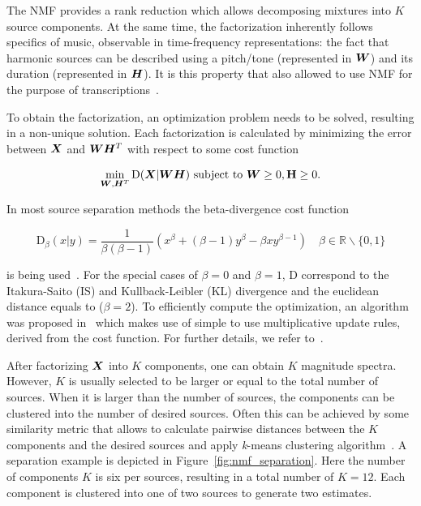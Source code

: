 The NMF provides a rank reduction which allows decomposing mixtures into \(K\) source components.
At the same time, the factorization inherently follows specifics of music, observable in time-frequency representations: the fact that harmonic sources can be described using a pitch/tone (represented in \({\bm{W}}\)) and its duration (represented in \({\bm{H}}\)).
It is this property that also allowed to use NMF for the purpose of transcriptions~\cite{smaragdis03}.
\par
To obtain the factorization, an optimization problem needs to be solved, resulting in a non-unique solution.
Each factorization is calculated by minimizing the error between \({\bm{X}}\) and \({\bm{W}} {\bm{H}}^{T}\) with respect to some cost function

\begin{equation}
  \min_{{\bm{W}},{\bm{H}}^{T}} \mathrm{D}({\bm{X}} | {\bm{W}} {\bm{H}}) \text { subject to } {\bm{W}} \geq 0 , \mathbf {{\bm{H}}} \geq 0.
\end{equation}

In most source separation methods the beta-divergence cost function

\begin{equation}
  \mathrm{D}_{\beta} (x | y) = \frac { 1 } { \beta ( \beta - 1 ) } \left( x ^ { \beta } + ( \beta - 1 ) y ^ { \beta } - \beta x y ^ { \beta - 1 } \right) \quad \beta \in \mathbb { R } \backslash \{ 0, 1 \}
\end{equation}

is being used~\cite{fitzgerald08a}. 
For the special cases of \(\beta = 0\) and \(\beta = 1\), \(\mathrm{D}\) correspond to the Itakura-Saito (IS) and Kullback-Leibler (KL) divergence and the euclidean distance equals to (\(\beta = 2\)).
To efficiently compute the optimization, an algorithm was proposed in~\cite{lee01} which makes use of simple to use multiplicative update rules, derived from the cost function.
For further details, we refer to~\cite{cichoki09}.
\par
After factorizing \({\bm{X}}\) into \(K\) components, one can obtain \(K\) magnitude spectra.
However, \(K\) is usually selected to be larger or equal to the total number of sources.
When it is larger than the number of sources, the components can be clustered into the number of desired sources.
Often this can be achieved by some similarity metric that allows to calculate pairwise distances between the \(K\) components and the desired sources and apply \textit{k}-means clustering algorithm~\cite{spiertz09}.
A separation example is depicted in Figure~\ref{fig:nmf_separation}. 
Here the number of components \(K\) is six per sources, resulting in a total number of \(K=12\). 
Each component is clustered into one of two sources to generate two estimates.

